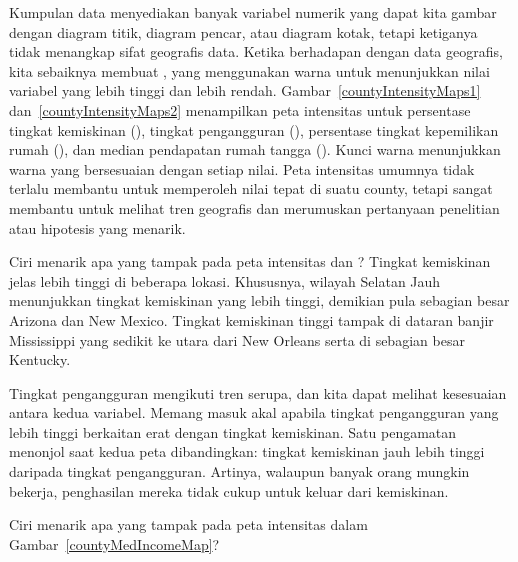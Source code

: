 
Kumpulan data  menyediakan banyak variabel numerik
yang dapat kita gambar dengan diagram titik, diagram pencar, atau
diagram kotak, tetapi ketiganya tidak menangkap sifat geografis
data. Ketika berhadapan dengan data geografis, kita sebaiknya
membuat , yang menggunakan warna untuk
menunjukkan nilai variabel yang lebih tinggi dan lebih rendah.
Gambar~\ref{countyIntensityMaps1} dan~\ref{countyIntensityMaps2}
menampilkan peta intensitas untuk persentase tingkat kemiskinan
(), tingkat pengangguran
(), persentase tingkat kepemilikan rumah
(), dan median pendapatan rumah tangga
().
Kunci warna menunjukkan warna yang bersesuaian dengan setiap nilai.
Peta intensitas umumnya tidak terlalu membantu untuk memperoleh
nilai tepat di suatu county, tetapi sangat membantu untuk melihat
tren geografis dan merumuskan pertanyaan penelitian atau hipotesis
yang menarik.

\begin{examplewrap}
\begin{nexample}{Ciri menarik apa yang tampak pada peta intensitas
     dan ?}
    \label{map_example_poverty_and_unemployment}
  Tingkat kemiskinan jelas lebih tinggi di beberapa lokasi.
  Khususnya, wilayah Selatan Jauh menunjukkan tingkat kemiskinan
  yang lebih tinggi, demikian pula sebagian besar Arizona dan
  New Mexico. Tingkat kemiskinan tinggi tampak di dataran banjir
  Mississippi yang sedikit ke utara dari New Orleans serta di
  sebagian besar Kentucky.

  Tingkat pengangguran mengikuti tren serupa, dan kita dapat
  melihat kesesuaian antara kedua variabel. Memang masuk akal
  apabila tingkat pengangguran yang lebih tinggi berkaitan erat
  dengan tingkat kemiskinan. Satu pengamatan menonjol saat kedua
  peta dibandingkan: tingkat kemiskinan jauh lebih tinggi daripada
  tingkat pengangguran. Artinya, walaupun banyak orang mungkin
  bekerja, penghasilan mereka tidak cukup untuk keluar dari
  kemiskinan.
\end{nexample}
\end{examplewrap}

\begin{exercisewrap}
\begin{nexercise}
Ciri menarik apa yang tampak pada peta intensitas
 dalam
Gambar~\ref{countyMedIncomeMap}?\footnotemark{}
\end{nexercise}
\end{exercisewrap}

